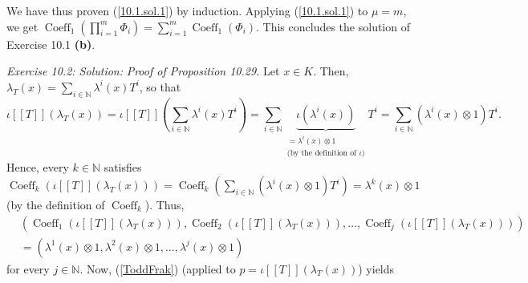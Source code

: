 \documentclass[numbers=enddot,12pt,final,onecolumn,notitlepage]{scrartcl}%
\begin{document}
We have thus proven (\ref{10.1.sol.1}) by induction. Applying
(\ref{10.1.sol.1}) to $\mu=m$, we get $\operatorname*{Coeff}\nolimits_{1}%
\left(  \prod\limits_{i=1}^{m}\Phi_{i}\right)  =\sum\limits_{i=1}%
^{m}\operatorname*{Coeff}\nolimits_{1}\left(  \Phi_{i}\right)  $. This
concludes the solution of Exercise 10.1 \textbf{(b)}.

\textit{Exercise 10.2: Solution:} \textit{Proof of Proposition 10.29.} Let
$x\in K$. Then, $\lambda_{T}\left(  x\right)  =\sum\limits_{i\in\mathbb{N}%
}\lambda^{i}\left(  x\right)  T^{i}$, so that%
\[
\iota\left[  \left[  T\right]  \right]  \left(  \lambda_{T}\left(  x\right)
\right)  =\iota\left[  \left[  T\right]  \right]  \left(  \sum\limits_{i\in
\mathbb{N}}\lambda^{i}\left(  x\right)  T^{i}\right)  =\sum\limits_{i\in
\mathbb{N}}\underbrace{\iota\left(  \lambda^{i}\left(  x\right)  \right)
}_{\substack{=\lambda^{i}\left(  x\right)  \otimes1\\\text{(by the definition
of }\iota\text{)}}}T^{i}=\sum\limits_{i\in\mathbb{N}}\left(  \lambda
^{i}\left(  x\right)  \otimes1\right)  T^{i}.
\]
Hence, every $k\in\mathbb{N}$ satisfies $\operatorname*{Coeff}\nolimits_{k}%
\left(  \iota\left[  \left[  T\right]  \right]  \left(  \lambda_{T}\left(
x\right)  \right)  \right)  =\operatorname*{Coeff}\nolimits_{k}\left(
\sum\limits_{i\in\mathbb{N}}\left(  \lambda^{i}\left(  x\right)
\otimes1\right)  T^{i}\right)  =\lambda^{k}\left(  x\right)  \otimes1$ (by the
definition of $\operatorname*{Coeff}\nolimits_{k}$). Thus,
\begin{align}
&  \left(  \operatorname*{Coeff}\nolimits_{1}\left(  \iota\left[  \left[
T\right]  \right]  \left(  \lambda_{T}\left(  x\right)  \right)  \right)
,\operatorname*{Coeff}\nolimits_{2}\left(  \iota\left[  \left[  T\right]
\right]  \left(  \lambda_{T}\left(  x\right)  \right)  \right)
,...,\operatorname*{Coeff}\nolimits_{j}\left(  \iota\left[  \left[  T\right]
\right]  \left(  \lambda_{T}\left(  x\right)  \right)  \right)  \right)
\nonumber\\
&  =\left(  \lambda^{1}\left(  x\right)  \otimes1,\lambda^{2}\left(  x\right)
\otimes1,...,\lambda^{j}\left(  x\right)  \otimes1\right)  \label{10.29.pf.1}%
\end{align}
for every $j\in\mathbb{N}$. Now, (\ref{ToddFrak}) (applied to $p=\iota\left[
\left[  T\right]  \right]  \left(  \lambda_{T}\left(  x\right)  \right)  $)
yields%
\end{document}
